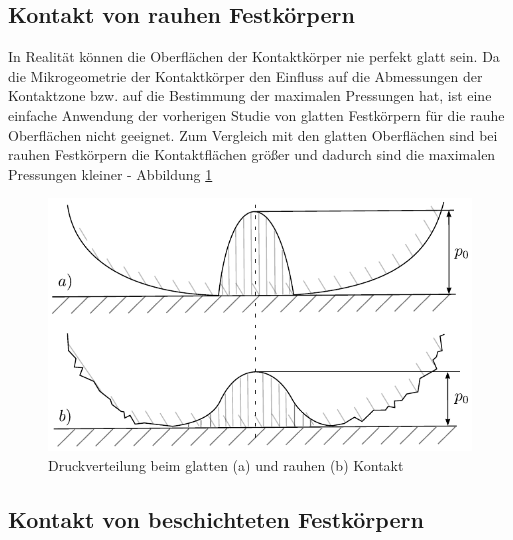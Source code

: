 \subsection*{Kontakt von rauhen Festkörpern}
\label{sub:kontakt_von_rauhen_festkoerpern}
In Realität können die Oberflächen der Kontaktkörper nie perfekt glatt sein.
Da die Mikrogeometrie der Kontaktkörper den Einfluss auf die Abmessungen der Kontaktzone bzw. auf die Bestimmung der maximalen Pressungen hat, ist eine einfache Anwendung der vorherigen Studie von glatten Festkörpern für die rauhe Oberflächen nicht geeignet.
Zum Vergleich mit den glatten Oberflächen sind bei rauhen Festkörpern die Kontaktflächen größer und dadurch sind die maximalen Pressungen kleiner - Abbildung \ref{fig:druckverteilung_beim_glatten_und_rauhen_kontakt}
\begin{figure}[htb]
    \centering
    \includegraphics[]{./images/druckverteilung_im_konzentrierten_kontakt.pdf}
    \caption{Druckverteilung beim glatten (a) und rauhen (b) Kontakt\cite{wisniewski}}
    \label{fig:druckverteilung_beim_glatten_und_rauhen_kontakt}
\end{figure}
%


\subsection*{Kontakt von beschichteten Festkörpern}
\label{sub:kontakt_von_beschichteten_Festkoerpern}


